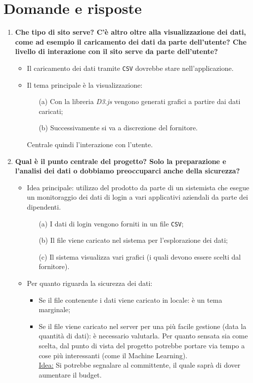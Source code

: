 \documentclass[11pt]{article}
\begin{document}
	\newpage

	\section{Domande e risposte}
		\begin{enumerate}
			\item \textbf{Che tipo di sito serve?
			C'è altro oltre alla visualizzazione dei dati, come ad esempio il caricamento dei dati da parte dell'utente?
			Che livello di interazione con il sito serve da parte dell'utente?}
			\medskip
			\begin{itemize}
				\item Il caricamento dei dati tramite \texttt{CSV} dovrebbe stare nell'applicazione.
				\item Il tema principale è la visualizzazione:
				\begin{itemize}
					\item [(a)] Con la libreria \textit{D3.js} vengono generati grafici a partire dai dati caricati;
					\item [(b)] Successivamente si va a discrezione del fornitore.
				\end{itemize}
				Centrale quindi l'interazione con l'utente.
			\end{itemize}
		
			\bigskip
			
			\item \textbf{Qual è il punto centrale del progetto?
			Solo la preparazione e l'analisi dei dati o dobbiamo preoccuparci anche della sicurezza?}
			\medskip
			\begin{itemize}
				\item Idea principale: utilizzo del prodotto da parte di un sistemista che esegue un monitoraggio
				dei dati di login a vari applicativi aziendali da parte dei dipendenti.
				\begin{itemize}
					\item [(a)] I dati di login vengono forniti in un file \texttt{CSV};
					\item [(b)] Il file viene caricato nel sistema per l'esplorazione dei dati;
					\item [(c)] Il sistema visualizza vari grafici (i quali devono essere scelti dal fornitore).
				\end{itemize}
				\item Per quanto riguarda la sicurezza dei dati:
				\begin{itemize}
					\item Se il file contenente i dati viene caricato in locale: è un tema marginale;
					\item Se il file viene caricato nel server per una più facile gestione (data la quantità di dati):
					è necessario valutarla.
					Per quanto sensata sia come scelta, dal punto di vista del progetto potrebbe portare via tempo a
					cose più interessanti (come il Machine Learning).\\
					\underline{Idea:} Si potrebbe segnalare al  committente, il quale saprà di dover aumentare il budget.
				\end{itemize}
			\end{itemize}


\end{enumerate}
\end{document}
